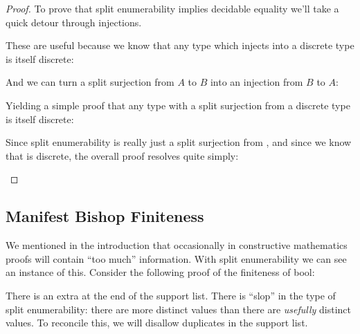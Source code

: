 \begin{proof}
To prove that split enumerability implies decidable equality we'll take a quick
detour through injections.
\begin{agdalisting*}
  \begin{multicols}{2}
     \columnbreak
  \end{multicols}
\end{agdalisting*}
These are useful because we know that any type which injects into a discrete
type is itself discrete:
\begin{agdalisting*}
\end{agdalisting*}
And we can turn a split surjection from \(A\) to \(B\) into an injection from
\(B\) to \(A\):
\begin{agdalisting*}
\end{agdalisting*}
Yielding a simple proof that any type with a split surjection from a discrete
type is itself discrete:
\begin{agdalisting*}
\end{agdalisting*}
Since split enumerability is really just a split surjection from
, and since we know that  is discrete, the
overall proof resolves quite simply:
\begin{agdalisting*}
\end{agdalisting*}
\end{proof}

\subsection{Manifest Bishop Finiteness}\label{manifest-bishop-finiteness}
We mentioned in the introduction that occasionally in constructive mathematics
proofs will contain ``too much'' information.
With split enumerability we can see an instance of this.
Consider the following proof of the finiteness of bool:
\begin{agdalisting}\label{op-slop}
\end{agdalisting}
There is an extra  at the end of the support
list.
There is ``slop'' in the type of split enumerability: there are more distinct
values than there are \emph{usefully} distinct values.
To reconcile this, we will disallow duplicates in the support list.

